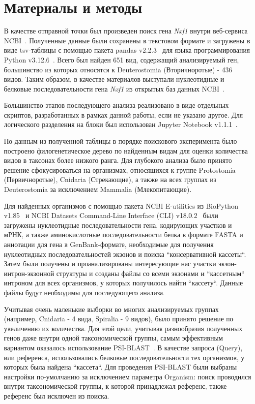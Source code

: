 \newpage
\section{Материалы и методы}

В качестве отправной точки был произведен поиск гена \textit{Nxf1} внутри веб-сервиса NCBI~\cite{ncbi_general}.
Полученные данные были сохранены в текстовом формате и загружены в виде tsv-таблицы с помощью пакета pandas v2.2.3~\cite{pandas} для языка программирования Python v3.12.6~\cite{python_3_12}.
Всего был найден 651 вид, содержащий анализируемый ген, большинство из которых относятся к Deuterostomia (Вторичноротые) - 436 видов.
Таким образом, в качестве материалов выступали нуклеотидные и белковые последовательности гена \textit{Nxf1} из открытых баз данных NCBI~\cite{ncbi_general}.

Большинство этапов последующего анализа реализовано в виде отдельных скриптов, разработанных в рамках данной работы, если не указано другое.
Для логического разделения на блоки был использован Jupyter Notebook v1.1.1~\cite{jupyter_notebook}.

По данным из полученной таблицы в порядке поискового эксперимента было построено филогенетическое дерево по найденным видам для оценки количества видов в таксонах более низкого ранга.
Для глубокого анализа было принято решение сфокусироваться на организмах, относящихся к группе Protostomia (Первичноротые), Cnidaria (Стрекающие), а также на всех группах из Deuterostomia за исключением Mammalia (Млекопитающие).

Для найденных организмов с помощью пакета NCBI E-utilities из BioPython v1.85~\cite{biopython} и NCBI Datasets Command-Line Interface (CLI) v18.0.2~\cite{datasets} были загружены нуклеотидные последовательности гена, кодирующих участков и мРНК, а также аминокислотные последовательности белка в формате FASTA и аннотации для гена в GenBank-формате, необходимые для получения нуклеотидных последовательностей экзонов и поиска ``консервативной кассеты``.
Затем были получены и проанализированы интересующие нас участки экзон-интрон-экзонной структуры и созданы файлы со всеми экзонами и ``кассетным`` интроном для всех организмов, у которых получилось найти ``кассету``.
Данные файлы будут необходимы для последующего анализа.

Учитывая очень маленькие выборки во многих анализируемых группах (например, Cnidaria - 4 вида, Spiralia - 9 видов), было принято решение по увеличению их количества.
Для этой цели, учитывая разнообразия полученных генов даже внутри одной таксономической группы, самым эффективным вариантом оказалось использование PSI-BLAST~\cite{psi_blast}.
В качестве запроса (Query), или референса, использовались белковые последовательности тех организмов, у которых была найдена ``кассета``.
Для проведения PSI-BLAST были выбраны настройки по-умолчанию за исключением параметра Organism: поиск проводился внутри таксономической группы, к которой принадлежал референс, также референс был исключен из поиска.

